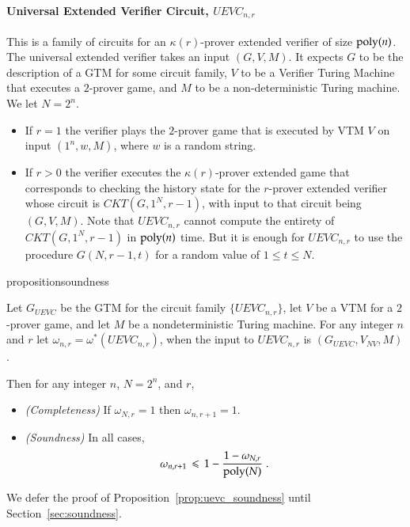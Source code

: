\paragraph{Universal Extended Verifier Circuit, $UEVC_{n,r}$} This is a family of circuits for an $\kappa(r)$-prover extended verifier of size $\operatorname{poly}(n)$. The universal extended verifier takes an input $(G,V,M)$. It expects $G$ to be the description of a GTM for some circuit family, $V$ to be a Verifier Turing Machine that executes a $2$-prover game, and $M$ to be a non-deterministic Turing machine. %
We let $N = 2^n$.
\begin{itemize}
\item If $r=1$ the verifier plays the $2$-prover game that is executed by VTM $V$ on input $(1^n,w,M)$, where $w$ is a random string.

\item If $r>0$ the verifier executes the $\kappa(r)$-prover extended game that corresponds to checking the history state for the $r$-prover extended verifier whose circuit is $CKT(G,1^N,r-1)$, with input to that circuit being $(G,V,M)$. Note that $UEVC_{n,r}$ cannot compute the entirety of $CKT(G,1^N,r-1)$ in $\operatorname{poly}(n)$ time. But it is enough for $UEVC_{n,r}$ to use the procedure $G(N,r-1,t)$ for a random value of $1\leq t\leq N$.
\end{itemize}

\begin{restatable}{proposition}{soundness}


	Let $G_{UEVC}$ be the GTM for the circuit family $\{UEVC_{n,r}\}$, let $V$ be a VTM for a $2$-prover game, and let $M$ be a nondeterministic Turing machine. For any integer $n$ and $r$ let $\omega_{n,r} = \omega^*(UEVC_{n,r})$, when the input to $UEVC_{n,r}$ is $(G_{UEVC},V_{NV},M)$. 
	
	Then for any integer $n$, $N=2^n$, and $r$,
	\begin{itemize}
	\item \emph{(Completeness)} If $\omega_{N,r}=1$ then $\omega_{n,r+1}=1$.
	\item \emph{(Soundness)} In all cases,
	\[
		\omega_{n,r+1} \,\leqslant\, 1 - \frac{1 - \omega_{N,r}}{\operatorname{poly}(N)}\;.
	\]
	\end{itemize}
	\label{prop:uevc_soundness}
\end{restatable}

We defer the proof of Proposition~\ref{prop:uevc_soundness} until Section~\ref{sec:soundness}. 


